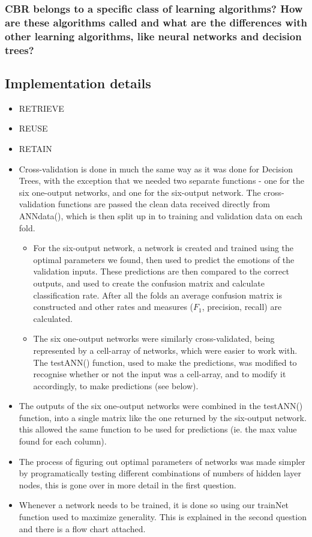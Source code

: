 \documentclass[12pt]{article}
\begin{document}
\subsubsection*{CBR belongs to a specific class of learning algorithms? How are these algorithms called and what are the differences with other learning algorithms, like neural networks and decision trees?}


\subsection*{Implementation details}
\begin{itemize}
  \item RETRIEVE
  \item REUSE
  \item RETAIN
  \item Cross-validation is done in much the same way as it was done for Decision Trees, with the exception that we needed two separate functions - one for the six one-output networks, and one for the six-output network. The cross-validation functions are passed the clean data received directly from ANNdata(), which is then split up in to training and validation data on each fold.
  \begin{itemize}
    \item For the six-output network, a network is created and trained using the optimal parameters we found, then used to predict the emotions of the validation inputs. These predictions are then compared to the correct outputs, and used to create the confusion matrix and calculate classification rate. After all the folds an average confusion matrix is constructed and other rates and measures ($F_1$, precision, recall) are calculated.
    \item The six one-output networks were similarly cross-validated, being represented by a cell-array of networks, which were easier to work with. The testANN() function, used to make the predictions, was modified to recognise whether or not the input was a cell-array, and to modify it accordingly, to make predictions (see below).
  \end{itemize}
  \item The outputs of the six one-output networks were combined in the testANN() function, into a single matrix like the one returned by the six-output network. this allowed the same function to be used for predictions (ie. the max value found for each column).
  \item The process of figuring out optimal parameters of networks was made simpler by programatically testing different combinations of numbers of hidden layer nodes, this is gone over in more detail in the first question.
  \item Whenever a network needs to be trained, it is done so using our trainNet function used to maximize generality. This is explained in the second question and there is a flow chart attached.
\end{itemize}
\end{document}
